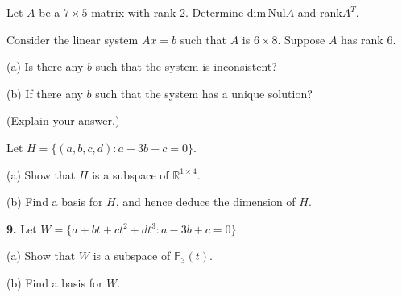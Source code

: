\documentclass[11pt]{article} %
\begin{document}
\medskip
{}
Let $A$ be a $7\times 5$ matrix with rank 2. 
Determine dim\,Nul$A$ and rank$A^T$.


\medskip
{}
Consider the linear system $Ax = b$ such that $A$ is
$6\times 8$. Suppose $A$ has rank 6. 

(a) Is there any $b$ such that the system is inconsistent?

(b) If there any $b$ such that the system has a unique solution?

(Explain your answer.)


\medskip
{} 
Let $H = \{(a,b,c,d):a-3b+c=0\}$. 

(a) Show that $H$ is a subspace of ${\mathbb R}^{1\times 4}$.

(b) Find a basis for $H$, and hence deduce the dimension of $H$.


\medskip
\noindent
{\bf 9.} Let $W = \{a+bt+ct^2 + dt^3: a-3b+c = 0\}$.

(a) Show that $W$ is a subspace of ${\mathbb P}_3(t)$.

(b) Find a basis for $W$.
\end{document}
